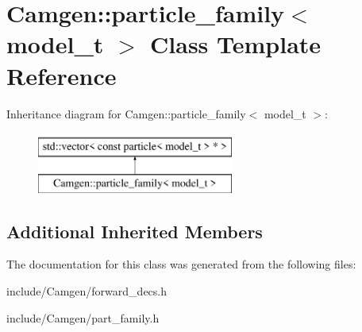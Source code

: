 \hypertarget{a00397}{\section{Camgen\-:\-:particle\-\_\-family$<$ model\-\_\-t $>$ Class Template Reference}
\label{a00397}
}
Inheritance diagram for Camgen\-:\-:particle\-\_\-family$<$ model\-\_\-t $>$\-:\begin{figure}[H]
\begin{center}
\leavevmode
\includegraphics[height=2.000000cm]{a00397}
\end{center}
\end{figure}
\subsection*{Additional Inherited Members}


The documentation for this class was generated from the following files\-:\begin{DoxyCompactItemize}
\item 
include/\-Camgen/forward\-\_\-decs.\-h\item 
include/\-Camgen/part\-\_\-family.\-h\end{DoxyCompactItemize}
